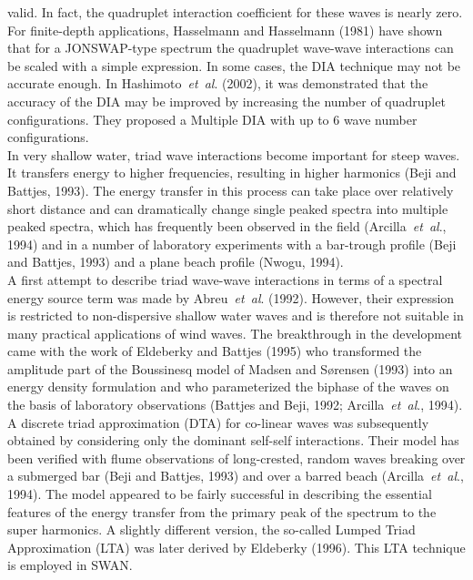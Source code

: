 \documentclass[12pt]{book}
\begin{document}
valid. In fact, the quadruplet interaction coefficient for these waves is nearly zero. For finite-depth
applications, Hasselmann and Hasselmann (1981) have shown that for a JONSWAP-type spectrum the quadruplet
wave-wave interactions can be scaled with a simple expression.
In some cases, the DIA technique may not be accurate enough. In Hashimoto~{\it et~al}. (2002), it was
demonstrated that the accuracy of the DIA may be improved by increasing the number of quadruplet
configurations. They proposed a Multiple DIA with up to 6 wave number configurations.
\\[2ex]
\noindent
In very shallow water, triad wave interactions become important for steep waves. It
transfers energy to higher frequencies, resulting in higher harmonics (Beji and Battjes, 1993).
The energy transfer in this process can take place over relatively short distance and can
dramatically change single peaked spectra into multiple peaked spectra, which has frequently
been observed in the field (Arcilla~{\it et~al}., 1994) and in a number of laboratory
experiments with a bar-trough profile (Beji and Battjes, 1993) and a plane beach profile
(Nwogu, 1994).
\\[2ex]
\noindent
A first attempt to describe triad wave-wave interactions in terms of a spectral energy source term was
made by Abreu~{\it et~al}. (1992). However, their expression is restricted to non-dispersive shallow water
waves and is therefore not suitable in many practical applications of wind waves. The breakthrough in the
development came with the work of Eldeberky and Battjes (1995) who transformed the amplitude part of
the Boussinesq model of Madsen and S{\o}rensen (1993) into an energy density formulation and who
parameterized the biphase of the waves on the basis of laboratory observations (Battjes and Beji, 1992;
Arcilla~{\it et~al}., 1994). A discrete triad approximation (DTA) for co-linear waves was subsequently
obtained by considering only the dominant self-self interactions. Their model has been verified with flume
observations of long-crested, random waves breaking over a submerged bar (Beji and Battjes, 1993) and
over a barred beach (Arcilla~{\it et~al}., 1994). The model appeared to be fairly successful in describing
the essential features of the energy transfer from the primary peak of the spectrum to the super harmonics.
A slightly different version, the so-called Lumped Triad Approximation (LTA) was later derived by
Eldeberky (1996). This LTA technique is employed in SWAN.
\nocite{Bej93B,Res01PTV,Vle03B,You93V,Has85HAB,Has81H,Has02HH,Abr92LT,Eld95B,Mad93S,Eld96}
\end{document}
